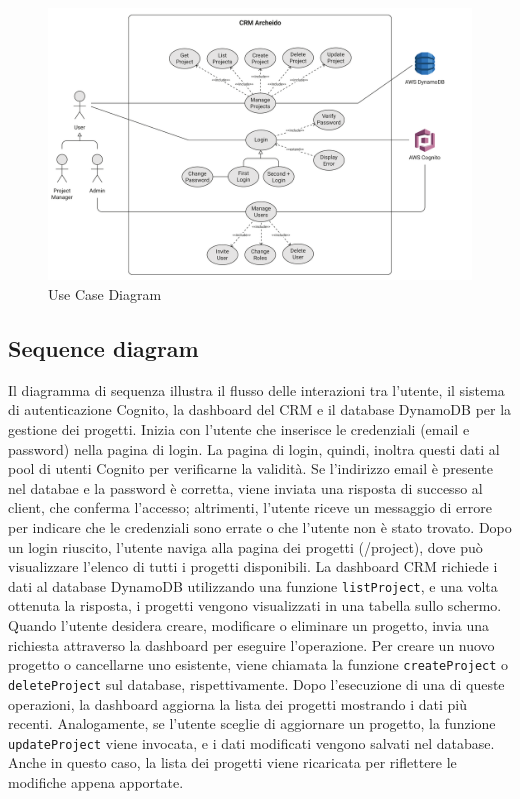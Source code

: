 \documentclass[target=bach,aauheader=,style=]{thud}
\begin{document}
\begin{figure}[H]
    \centering
    \includegraphics[width=1\textwidth]{img/diagrammi/use_case.pdf} 
    \caption{Use Case Diagram}
\end{figure}

\subsection{Sequence diagram}
Il diagramma di sequenza illustra il flusso delle interazioni tra l'utente, il sistema di autenticazione Cognito, la dashboard del CRM e il database DynamoDB per la gestione dei progetti. Inizia con l'utente che inserisce le credenziali (email e password) nella pagina di login. La pagina di login, quindi, inoltra questi dati al pool di utenti Cognito per verificarne la validità. Se l'indirizzo email è presente nel databae e la password è corretta, viene inviata una risposta di successo al client, che conferma l'accesso; altrimenti, l'utente riceve un messaggio di errore per indicare che le credenziali sono errate o che l'utente non è stato trovato. Dopo un login riuscito, l'utente naviga alla pagina dei progetti (/project), dove può visualizzare l'elenco di tutti i progetti disponibili. La dashboard CRM richiede i dati al database DynamoDB utilizzando una funzione \texttt{listProject}, e una volta ottenuta la risposta, i progetti vengono visualizzati in una tabella sullo schermo. Quando l'utente desidera creare, modificare o eliminare un progetto, invia una richiesta attraverso la dashboard per eseguire l'operazione. Per creare un nuovo progetto o cancellarne uno esistente, viene chiamata la funzione \texttt{createProject} o \texttt{deleteProject} sul database, rispettivamente. Dopo l'esecuzione di una di queste operazioni, la dashboard aggiorna la lista dei progetti mostrando i dati più recenti. Analogamente, se l'utente sceglie di aggiornare un progetto, la funzione \texttt{updateProject} viene invocata, e i dati modificati vengono salvati nel database. Anche in questo caso, la lista dei progetti viene ricaricata per riflettere le modifiche appena apportate.
\end{document}

